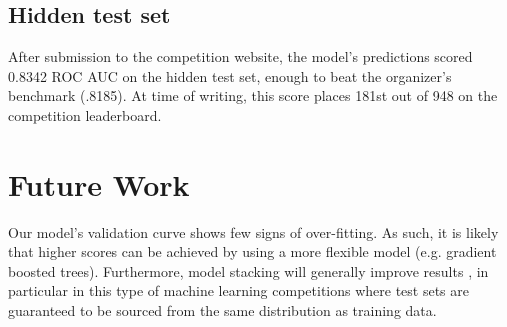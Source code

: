 \documentclass{article}[12pt]
\begin{document}
\subsection{Hidden test set}

After submission to the competition website, the model's predictions scored 0.8342 ROC AUC on the hidden test set,
enough to beat the organizer's benchmark (.8185). At time of writing, this score places
181st out of 948 on the competition leaderboard. 

\section{Future Work}

Our  model's validation curve shows few signs of over-fitting. As such, it is likely that
higher scores can be achieved by using a more flexible model (e.g. gradient boosted trees).
Furthermore, model stacking will generally improve results \cite{elements}, in particular
in this type of machine learning competitions where test sets are guaranteed to be sourced
from the same distribution as training data.

{}

\end{document}
